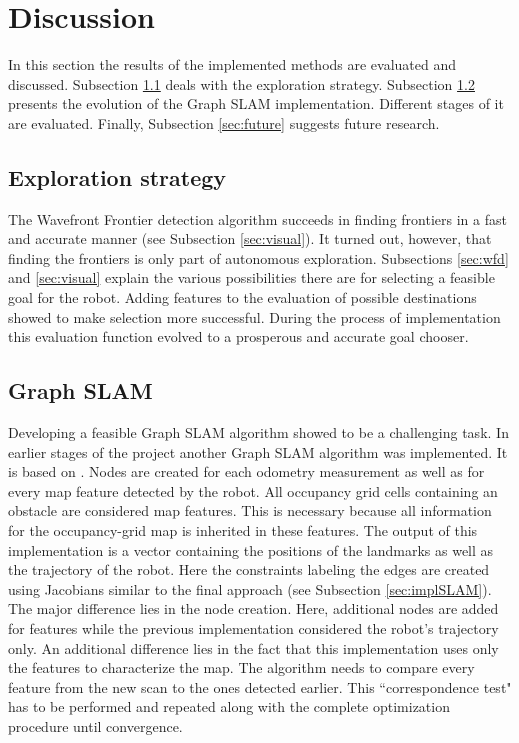 \documentclass{ba-kecs}
\begin{document}
\section{Discussion}
\label{sec:disc}
In this section the results of the implemented methods are evaluated and discussed. 
Subsection \ref{disc:expl} deals with the exploration strategy. Subsection \ref{disc:grSlam} presents the evolution of the Graph SLAM implementation. Different stages of it are evaluated. Finally, Subsection \ref{sec:future} suggests future research.
\subsection{Exploration strategy}
\label{disc:expl}
The Wavefront Frontier detection algorithm \citep{Keidar} succeeds in finding frontiers in a fast and accurate manner (see Subsection \ref{sec:visual}). It turned out, however, that finding the frontiers is only part of autonomous exploration. Subsections \ref{sec:wfd} and \ref{sec:visual} explain the various possibilities there are for selecting a feasible goal for the robot. Adding features to the evaluation of possible destinations showed to make selection more successful. During the process of implementation this evaluation function evolved to a prosperous and accurate goal chooser.
\\
\subsection{Graph SLAM}
\label{disc:grSlam}
Developing a feasible Graph SLAM algorithm showed to be a challenging task. In earlier stages of the project another Graph SLAM algorithm was implemented.
It is based on \cite{Thrun}. 
Nodes are created for each odometry measurement as well as for every map feature detected by the robot. All occupancy grid cells containing an obstacle are considered map features. This is necessary because all information for the occupancy-grid map is inherited in these features. The output of this implementation is a vector containing the positions of the landmarks as well as the trajectory of the robot. Here the constraints labeling the edges are created using Jacobians similar to the final approach (see Subsection \ref{sec:implSLAM}). The major difference lies in the node creation. Here, additional nodes are added for features while the previous implementation considered the robot's trajectory only. An additional difference lies in the fact that this implementation uses only the features to characterize the map. The algorithm needs to compare every feature from the new scan to the ones detected earlier. This ``correspondence test" has to be performed and repeated along with the complete optimization procedure until convergence. 
\end{document}
